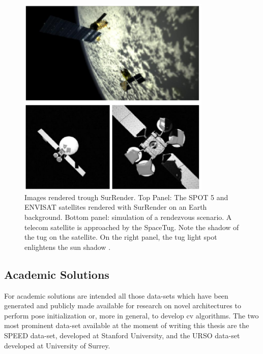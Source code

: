 \begin{figure}[htbp]
  \centering
  \includegraphics[width=0.82\textwidth]{gfx/surrender.eps}
  \caption{Images rendered trough SurRender. Top Panel: The SPOT 5 and ENVISAT satellites rendered with SurRender on an Earth background. Bottom
    panel: simulation of a rendezvous scenario. A telecom satellite is approached by the SpaceTug. Note the shadow of
    the tug on the satellite. On the right panel, the tug light spot enlightens the sun shadow \cite{Brochard2018ScientificIR}.}
  \label{fig:surrender}
\end{figure}

\subsection{Academic Solutions}
For academic solutions are intended all those data-sets which have been generated and publicly made available for research on novel architectures to perform pose initialization or, more in general, to develop \acrshort{cv} algorithms. The two most prominent data-set available at the moment of writing this thesis are the SPEED data-set, developed at Stanford University, and the URSO data-set developed at University of Surrey.

